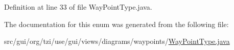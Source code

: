 Definition at line 33 of file Way\-Point\-Type.\-java.



The documentation for this enum was generated from the following file\-:\begin{DoxyCompactItemize}
\item 
src/gui/org/tzi/use/gui/views/diagrams/waypoints/\hyperlink{_way_point_type_8java}{Way\-Point\-Type.\-java}\end{DoxyCompactItemize}

